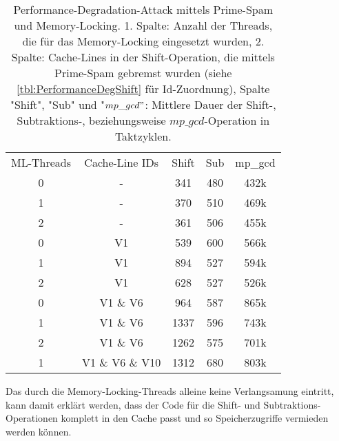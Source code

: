 \begin{table}[h]
\caption{Performance-Degradation-Attack mittels Prime-Spam und Memory-Locking. 1. Spalte: Anzahl der Threads, die für das Memory-Locking eingesetzt wurden, 2. Spalte: Cache-Lines in der Shift-Operation, die mittels Prime-Spam gebremst wurden (siehe \ref{tbl:PerformanceDegShift} für Id-Zuordnung), Spalte "Shift", "Sub" und "$mp\_gcd"$: Mittlere Dauer der Shift-, Subtraktions-, beziehungsweise $mp\_gcd$-Operation in Taktzyklen.}
\label{tbl:MemoryLockingResults}
\begin{tabular}{ccccc}
ML-Threads & Cache-Line IDs     & Shift & Sub & mp\_gcd \\
0                   & -               & 341   & 480 & 432k    \\
1                   & -               & 370   & 510 & 469k    \\
2                   & -               & 361   & 506 & 455k    \\
0                   & V1              & 539   & 600 & 566k    \\
1                   & V1              & 894   & 527 & 594k    \\
2                   & V1              & 628   & 527 & 526k    \\
0                   & V1 \& V6        & 964   & 587 & 865k    \\
1                   & V1 \& V6        & 1337  & 596 & 743k    \\
2                   & V1 \& V6        & 1262  & 575 & 701k    \\
1                   & V1 \& V6 \& V10 & 1312  & 680 & 803k   
\end{tabular}
\end{table}

Das durch die Memory-Locking-Threads alleine keine Verlangsamung eintritt, kann damit erklärt werden, dass der Code für die Shift- und Subtraktions-Operationen komplett in den Cache passt und so Speicherzugriffe vermieden werden können.

